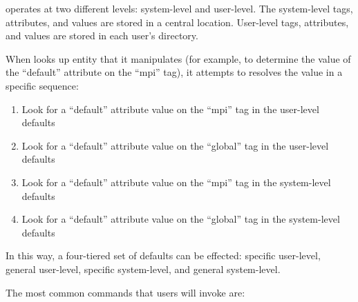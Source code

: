  operates at two different levels: system-level and
user-level.  The system-level tags, attributes, and values are stored
in a central location.  User-level tags, attributes, and values are
stored in each user's  directory.

When  looks up entity that it manipulates (for
example, to determine the value of the ``default'' attribute on the
``mpi'' tag), it attempts to resolves the value in a specific
sequence:

\begin{enumerate}
\item Look for a ``default'' attribute value on the ``mpi'' tag in
  the user-level defaults
  
\item Look for a ``default'' attribute value on the ``global'' tag in
  the user-level defaults
  
\item Look for a ``default'' attribute value on the ``mpi'' tag in
  the system-level defaults
  
\item Look for a ``default'' attribute value on the ``global'' tag in
  the system-level defaults
\end{enumerate}

In this way, a four-tiered set of defaults can be effected: specific
user-level, general user-level, specific system-level, and general
system-level.  

The most common  commands that users will invoke
are:

